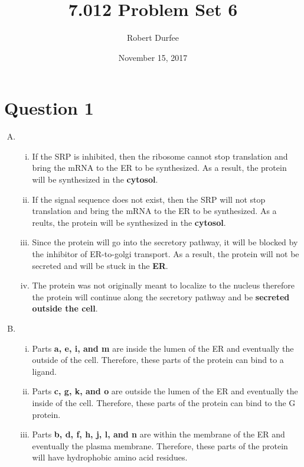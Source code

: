\documentclass{article}
\title{ 7.012 Problem Set 6 }
\author{ Robert Durfee }
\date{ November 15, 2017 }
\begin{document}
\maketitle

\section*{ Question 1 }

\begin{enumerate}[A.]
    \item 
        \begin{enumerate}[i.]
            \item If the SRP is inhibited, then the ribosome cannot stop
                translation and bring the mRNA to the ER to be synthesized. As a
                result, the protein will be synthesized in the \textbf{cytosol}.
            \item If the signal sequence does not exist, then the SRP will not
                stop translation and bring the mRNA to the ER to be synthesized.
                As a reults, the protein will be synthesized in the
                \textbf{cytosol}.
            \item Since the protein will go into the secretory pathway, it will
                be blocked by the inhibitor of ER-to-golgi transport. As a
                result, the protein will not be secreted and will be stuck in
                the \textbf{ER}.
            \item The protein was not originally meant to localize to the
                nucleus therefore the protein will continue along the secretory
                pathway and be \textbf{secreted outside the cell}.
        \end{enumerate}
    \item 
        \begin{enumerate}[i.]
            \item Parts \textbf{a, e, i, and m} are inside the lumen of the ER
                and eventually the outside of the cell. Therefore, these parts
                of the protein can bind to a ligand.
            \item Parts \textbf{c, g, k, and o} are outside the lumen of the ER
                and eventually the inside of the cell. Therefore, these parts of
                the protein can bind to the G protein.
            \item Parts \textbf{b, d, f, h, j, l, and n} are within the membrane
                of the ER and eventually the plasma membrane. Therefore, these
                parts of the protein will have hydrophobic amino acid residues.
        \end{enumerate}
\end{enumerate}
\end{document}
